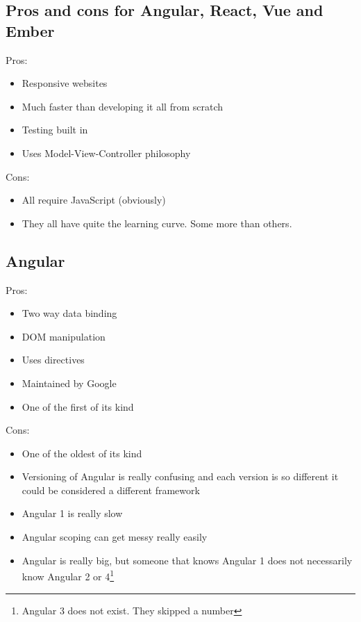 \documentclass[draftclsnofoot,onecolumn,letterpaper,10pt,compsoc]{IEEEtran}
\begin{document}
  \subsection{Pros and cons for Angular, React, Vue and Ember}
  Pros:
  \begin{itemize}
    \item Responsive websites
    \item Much faster than developing it all from scratch
    \item Testing built in
    \item Uses Model-View-Controller philosophy
  \end{itemize}

  Cons:
  \begin{itemize}
    \item All require JavaScript (obviously)
    \item They all have quite the learning curve. Some more than others.
  \end{itemize}

	\subsection{Angular}

    Pros:
    \begin{itemize}
      \item Two way data binding
      \item DOM manipulation
      \item Uses directives
      \item Maintained by Google
      \item One of the first of its kind
    \end{itemize}

    Cons:
    \begin{itemize}
      \item One of the oldest of its kind
      \item Versioning of Angular is really confusing and each version is so different it could be considered a different framework
      \item Angular 1 is really slow
      \item Angular scoping can get messy really easily
      \item Angular is really big, but someone that knows Angular 1 does not necessarily know Angular 2 or 4\footnote{Angular 3 does not exist. They skipped a number}
    \end{itemize}
\end{document}
